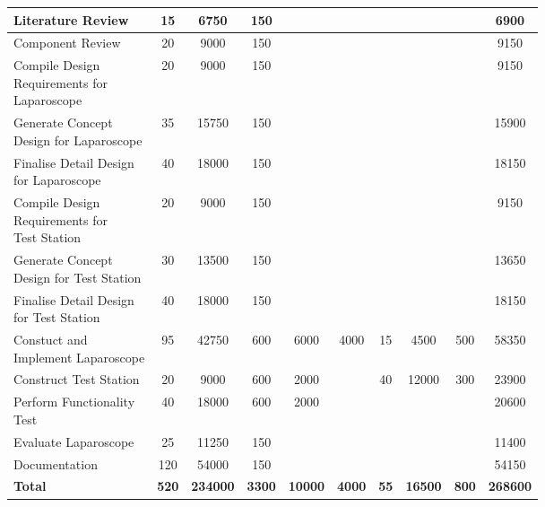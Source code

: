 \begin{landscape}
\begin{table}[H]
\begin{tabular}{|l|c|c|c|c|c|c|c|c|c|}
            Literature Review           & 15  & 6750   & 150  &       &      &    &       &     & 6900   \\
        \hline
            Component Review            & 20  & 9000   & 150  &       &      &    &       &     & 9150   \\
        \hline
            \makecell[l]{Compile Design \\ Requirements for \\ Laparoscope}
                            & 20  & 9000   & 150  &       &      &    &       &     & 9150   \\
        \hline
            \makecell[l]{Generate Concept \\ Design for Laparoscope}
                            & 35  & 15750  & 150  &       &      &    &       &     & 15900  \\
        \hline
            \makecell[l]{Finalise Detail Design \\ for Laparoscope}
                            & 40  & 18000  & 150  &       &      &    &       &     & 18150  \\
        \hline
            \makecell[l]{Compile Design \\ Requirements for \\ Test Station}
                            & 20  & 9000   & 150  &       &      &    &       &     & 9150   \\
        \hline
            \makecell[l]{Generate Concept \\ Design for Test Station}
                            & 30  & 13500  & 150  &       &      &    &       &     & 13650  \\
        \hline
            \makecell[l]{Finalise Detail Design \\ for Test Station}
                            & 40  & 18000  & 150  &       &      &    &       &     & 18150  \\
        \hline
            \makecell[l]{Constuct and \\ Implement Laparoscope}
                            & 95  & 42750  & 600  & 6000  & 4000 & 15 & 4500  & 500 & 58350  \\
        \hline
            Construct Test Station      & 20  & 9000   & 600  & 2000  &      & 40 & 12000 & 300 & 23900  \\
        \hline
            \makecell[l]{Perform Functionality \\ Test}
                            & 40  & 18000  & 600  & 2000  &      &    &       &     & 20600  \\
        \hline
            Evaluate Laparoscope        & 25  & 11250  & 150  &       &      &    &       &     & 11400  \\
        \hline
            Documentation               & 120 & 54000  & 150  &       &      &    &       &     & 54150  \\
        \hline
            \textbf{Total}              & \textbf{520} & \textbf{234000} & \textbf{3300} & \textbf{10000} & \textbf{4000} & \textbf{55} & \textbf{16500} & \textbf{800} & \textbf{268600} \\
        \hline


\end{tabular}
\end{table}
\end{landscape}

